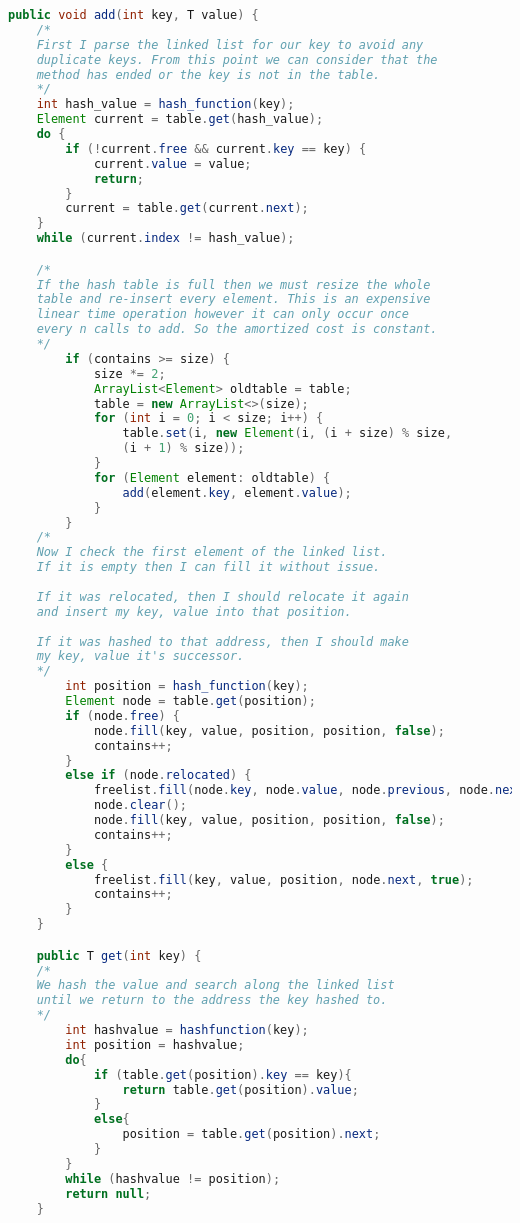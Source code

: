 \documentclass[10pt,\jkfside,a4paper]{article}
\begin{document}
\begin{enumerate}
\begin{enumerate}
\begin{lstlisting}[language=java]
    public void add(int key, T value) {
	/*
	First I parse the linked list for our key to avoid any 
	duplicate keys. From this point we can consider that the 
	method has ended or the key is not in the table.
	*/
	int hash_value = hash_function(key);
	Element current = table.get(hash_value);
	do {
		if (!current.free && current.key == key) {
			current.value = value;
			return;
		}
		current = table.get(current.next);
	}
	while (current.index != hash_value);

	/*
	If the hash table is full then we must resize the whole 
	table and re-insert every element. This is an expensive 
	linear time operation however it can only occur once 
	every n calls to add. So the amortized cost is constant.
	*/
        if (contains >= size) {
            size *= 2;
            ArrayList<Element> oldtable = table;
            table = new ArrayList<>(size);
            for (int i = 0; i < size; i++) {
                table.set(i, new Element(i, (i + size) % size, 
				(i + 1) % size));
            }
            for (Element element: oldtable) {
                add(element.key, element.value);
            }
        }
	/*
	Now I check the first element of the linked list. 
	If it is empty then I can fill it without issue.
	
	If it was relocated, then I should relocate it again 
	and insert my key, value into that position.
	
	If it was hashed to that address, then I should make 
	my key, value it's successor.
	*/
        int position = hash_function(key);
        Element node = table.get(position);
        if (node.free) {
            node.fill(key, value, position, position, false);
            contains++;
        }
        else if (node.relocated) {
            freelist.fill(node.key, node.value, node.previous, node.next, true);
            node.clear();
            node.fill(key, value, position, position, false);
            contains++;
        }
        else {
            freelist.fill(key, value, position, node.next, true);
            contains++;
        }
    }

    public T get(int key) {
	/*
	We hash the value and search along the linked list 
	until we return to the address the key hashed to.
	*/
        int hashvalue = hashfunction(key);
        int position = hashvalue;
        do{
            if (table.get(position).key == key){
                return table.get(position).value;
            }
            else{
                position = table.get(position).next;
            }
        }
        while (hashvalue != position);
        return null;
    }


\end{lstlisting}
\end{enumerate}
\end{enumerate}
\end{document}
